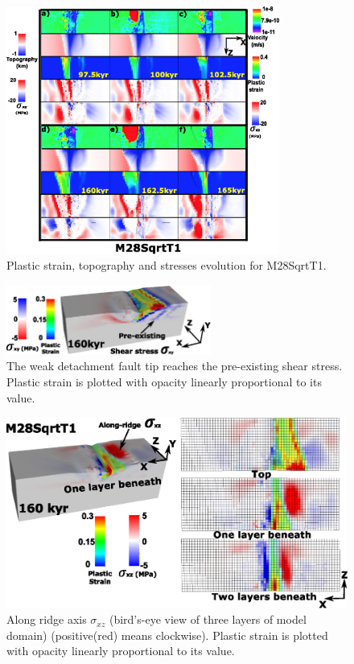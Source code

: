 \documentclass[draft,gc]{agutex}
\begin{document}
\begin{figure}[h]
\noindent\includegraphics[width=0.8\textwidth]{./Figures/fig_Results4_4_sqrt_cut_back_with_time_1.eps}
  \caption{Plastic strain, topography and stresses evolution for M28SqrtT1.}
 \label{fig_Results4_4}
\end{figure}  

\begin{figure}[h]
\noindent\includegraphics[width=0.6\textwidth]{./Figures/fig_Results4_5_sqrt_cut_back_pre_accummulated_shear_zone.eps}
  \caption[The weak detachment fault tip reaches the pre-existing shear stress.]{The weak detachment fault tip reaches the pre-existing shear stress. Plastic strain is plotted with opacity linearly proportional to its value.}
 \label{fig_Results4_5}
\end{figure}   

\begin{figure}[h]
\noindent\includegraphics[width=1.0\textwidth]{./Figures/fig_Results_3_2_5_sqrt_cut_back_Sxz_beneath.eps}
  \caption[Along ridge axis $\sigma_{xz}$.]{Along ridge axis $\sigma_{xz}$ (bird's-eye view of three layers of model domain) (positive(red) means clockwise). Plastic strain is plotted with opacity linearly proportional to its value.}
 \label{fig_Results_3_2_5_sqrt_cut_back_Sxz_beneath}
\end{figure}
\end{document}
